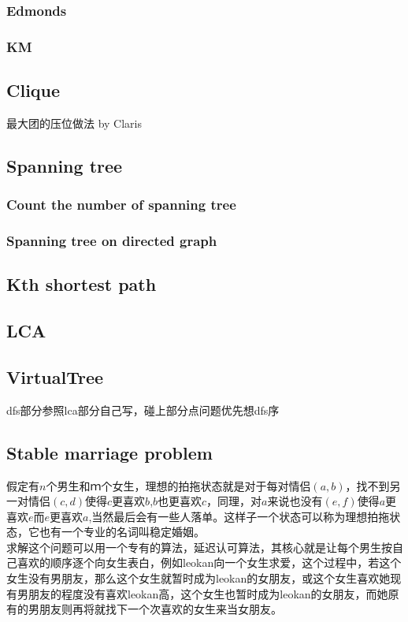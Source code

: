 \subsubsection{Edmonds}

\subsubsection{KM}


\subsection{Clique}


最大团的压位做法 by Claris \\



\subsection{Spanning tree}
\subsubsection{Count the number of spanning tree}

\subsubsection{Spanning tree on directed graph}


\subsection{Kth shortest path}

\subsection{LCA}

\subsection{VirtualTree}
dfs部分参照lca部分自己写，碰上部分点问题优先想dfs序

\subsection{Stable marriage problem}
	假定有$n$个男生和$ｍ$个女生，理想的拍拖状态就是对于每对情侣$(a,b)$，找不到另一对情侣$(c,d)$使得$c$更喜欢$b$,$b$也更喜欢$c$，同理，对$a$来说也没有$(e,f)$使得$a$更喜欢$e$而$e$更喜欢$a$,当然最后会有一些人落单。这样子一个状态可以称为理想拍拖状态，它也有一个专业的名词叫稳定婚姻。\\
	求解这个问题可以用一个专有的算法，延迟认可算法，其核心就是让每个男生按自己喜欢的顺序逐个向女生表白，例如leokan向一个女生求爱，这个过程中，若这个女生没有男朋友，那么这个女生就暂时成为leokan的女朋友，或这个女生喜欢她现有男朋友的程度没有喜欢leokan高，这个女生也暂时成为leokan的女朋友，而她原有的男朋友则再将就找下一个次喜欢的女生来当女朋友。



